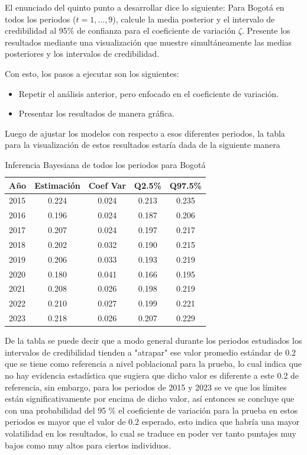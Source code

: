 \documentclass[12pt]{article}
\begin{document}
El enunciado del quinto punto a desarrollar dice lo siguiente:  Para Bogotá en todos los periodos ($t=1,\ldots,9$), calcule la media posterior y el intervalo de credibilidad al 95$\%$ de confianza para el coeficiente de variación $\zeta$. Presente los resultados mediante una visualización que muestre simultáneamente las medias posteriores y los intervalos de credibilidad.

Con esto, los pasos a ejecutar son los siguientes:

\begin{itemize}
    \item Repetir el análisis anterior, pero enfocado en el coeficiente de variación.
    \item Presentar los resultados de manera gráfica.
\end{itemize}

Luego de ajustar los modelos con respecto a esos diferentes periodos, la tabla para la visualización de estos resultados estaría dada de la siguiente manera

\begin{table}[H]
\centering
\begin{tabular}{lcccc}
\hline
\textbf{Año} & \textbf{Estimación} & \textbf{Coef Var} & \textbf{Q2.5\%} & \textbf{Q97.5\%} \\
\hline
2015 & 0.224 & 0.024 & 0.213 & 0.235 \\
2016 & 0.196 & 0.024 & 0.187 & 0.206 \\
2017 & 0.207 & 0.024 & 0.197 & 0.217 \\
2018 & 0.202 & 0.032 & 0.190 & 0.215 \\
2019 & 0.206 & 0.033 & 0.193 & 0.219 \\
2020 & 0.180 & 0.041 & 0.166 & 0.195 \\
2021 & 0.208 & 0.026 & 0.198 & 0.219 \\
2022 & 0.210 & 0.027 & 0.199 & 0.221 \\
2023 & 0.218 & 0.026 & 0.207 & 0.229 \\
\hline
\end{tabular}
\caption{Inferencia Bayesiana de todos los periodos para Bogotá}
\label{tab:bogota-coeficientes-periodos}
\end{table}

De la tabla se puede decir que a modo general durante los periodos estudiados los intervalos de credibilidad tienden a "atrapar" ese valor promedio estándar de 0.2 que se tiene como referencia a nivel poblacional para la prueba, lo cual indica que no hay evidencia estadística que sugiera que dicho valor es diferente a este 0.2 de referencia, sin embargo, para los periodos de 2015 y 2023 se ve que los límites están significativamente por encima de dicho valor, así entonces se concluye que con una probabilidad del 95 $\%$ el coeficiente de variación para la prueba en estos periodos es mayor que el valor de 0.2 esperado, esto indica que habría una mayor volatilidad en los resultados, lo cual se traduce en poder ver tanto puntajes muy bajos como muy altos para ciertos individuos.  \\
\end{document}

